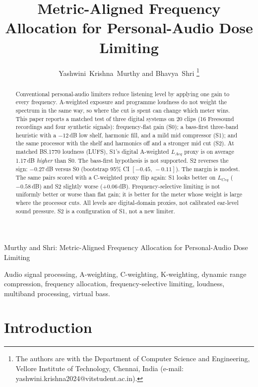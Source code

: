 \documentclass[12pt,journal,onecolumn]{IEEEtran}
\begin{document}
\title{Metric-Aligned Frequency Allocation for Personal-Audio Dose Limiting}

\author{Yashwini~Krishna~Murthy and Bhavya~Shri%
\thanks{The authors are with the Department of Computer Science and Engineering, Vellore Institute of Technology, Chennai, India (e-mail: yashwini.krishna2024@vitstudent.ac.in).}}

%
{Murthy and Shri: Metric-Aligned Frequency Allocation for Personal-Audio Dose Limiting}

\maketitle

\begin{abstract}
Conventional personal-audio limiters reduce listening level by applying one gain to every frequency. A-weighted exposure and programme loudness do not weight the spectrum in the same way, so where the cut is spent can change which meter wins. This paper reports a matched test of three digital systems on 20 clips (16 Freesound recordings and four synthetic signals): frequency-flat gain (S0); a bass-first three-band heuristic with a $-12$\,dB low shelf, harmonic fill, and a mild mid compressor (S1); and the same processor with the shelf and harmonics off and a stronger mid cut (S2). At matched BS.1770 loudness (LUFS), S1's digital A-weighted $L_{Aeq}$ proxy is on average 1.17\,dB \emph{higher} than S0. The bass-first hypothesis is not supported. S2 reverses the sign: $-0.27$\,dB versus S0 (bootstrap 95\% CI $[-0.45,\,-0.11]$). The margin is modest. The same pairs scored with a C-weighted proxy flip again: S1 looks better on $L_{Ceq}$ ($-0.58$\,dB) and S2 slightly worse ($+0.06$\,dB). Frequency-selective limiting is not uniformly better or worse than flat gain; it is better for the meter whose weight is large where the processor cuts. All levels are digital-domain proxies, not calibrated ear-level sound pressure. S2 is a configuration of S1, not a new limiter.
\end{abstract}

\begin{IEEEkeywords}
Audio signal processing, A-weighting, C-weighting, K-weighting, dynamic range compression, frequency allocation, frequency-selective limiting, loudness, multiband processing, virtual bass.
\end{IEEEkeywords}

\section{Introduction}
\end{document}
